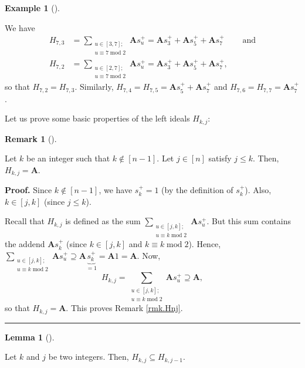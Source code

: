 \documentclass[numbers=enddot,12pt,final,onecolumn,notitlepage]{scrartcl}%
\theoremstyle{definition}
\newtheorem{lem}[theo]{Lemma}
\newenvironment{lemma}[1][]
{\begin{lem}[#1]\begin{leftbar}}
{\end{leftbar}\end{lem}}
\newtheorem{remk}[theo]{Remark}
\newenvironment{remark}[1][]
{\begin{remk}[#1]\begin{leftbar}}
{\end{leftbar}\end{remk}}
\newtheorem{exam}[theo]{Example}
\newenvironment{example}[1][]
{\begin{exam}[#1]\begin{leftbar}}
{\end{leftbar}\end{exam}}
\newenvironment{proof}[1][Proof]{\noindent\textbf{#1.} }{\ \rule{0.5em}{0.5em}}
\let\sumnonlimits\sum
\renewcommand{\sum}{\sumnonlimits\limits}
\begin{document}
\begin{example}
We have%
\begin{align*}
H_{7,3}  &  =\sum_{\substack{u\in\left[  3,7\right]  ;\\u\equiv
7\operatorname{mod}2}}\mathbf{A}s_{u}^{+}=\mathbf{A}s_{3}^{+}+\mathbf{A}%
s_{5}^{+}+\mathbf{A}s_{7}^{+}\ \ \ \ \ \ \ \ \ \ \text{and}\\
H_{7,2}  &  =\sum_{\substack{u\in\left[  2,7\right]  ;\\u\equiv
7\operatorname{mod}2}}\mathbf{A}s_{u}^{+}=\mathbf{A}s_{3}^{+}+\mathbf{A}%
s_{5}^{+}+\mathbf{A}s_{7}^{+},
\end{align*}
so that $H_{7,2}=H_{7,3}$. Similarly, $H_{7,4}=H_{7,5}=\mathbf{A}s_{5}%
^{+}+\mathbf{A}s_{7}^{+}$ and $H_{7,6}=H_{7,7}=\mathbf{A}s_{7}^{+}$.
\end{example}

Let us prove some basic properties of the left ideals $H_{k,j}$:

\begin{remark}
\label{rmk.Hnj}Let $k$ be an integer such that $k\notin\left[  n-1\right]  $.
Let $j\in\left[  n\right]  $ satisfy $j\leq k$. Then, $H_{k,j}=\mathbf{A}$.
\end{remark}

\begin{proof}
Since $k\notin\left[  n-1\right]  $, we have $s_{k}^{+}=1$ (by the definition
of $s_{k}^{+}$). Also, $k\in\left[  j,k\right]  $ (since $j\leq k$).

Recall that $H_{k,j}$ is defined as the sum $\sum_{\substack{u\in\left[
j,k\right]  ;\\u\equiv k\operatorname{mod}2}}\mathbf{A}s_{u}^{+}$. But this
sum contains the addend $\mathbf{A}s_{k}^{+}$ (since $k\in\left[  j,k\right]
$ and $k\equiv k\operatorname{mod}2$). Hence, $\sum_{\substack{u\in\left[
j,k\right]  ;\\u\equiv k\operatorname{mod}2}}\mathbf{A}s_{u}^{+}%
\supseteq\mathbf{A}\underbrace{s_{k}^{+}}_{=1}=\mathbf{A}1=\mathbf{A}$. Now,%
\[
H_{k,j}=\sum_{\substack{u\in\left[  j,k\right]  ;\\u\equiv k\operatorname{mod}%
2}}\mathbf{A}s_{u}^{+}\supseteq\mathbf{A},
\]
so that $H_{k,j}=\mathbf{A}$. This proves Remark \ref{rmk.Hnj}.
\end{proof}

\begin{lemma}
\label{lem.Hkj.some-basics}Let $k$ and $j$ be two integers. Then,
$H_{k,j}\subseteq H_{k,j-1}$.
\end{lemma}
\end{document}
